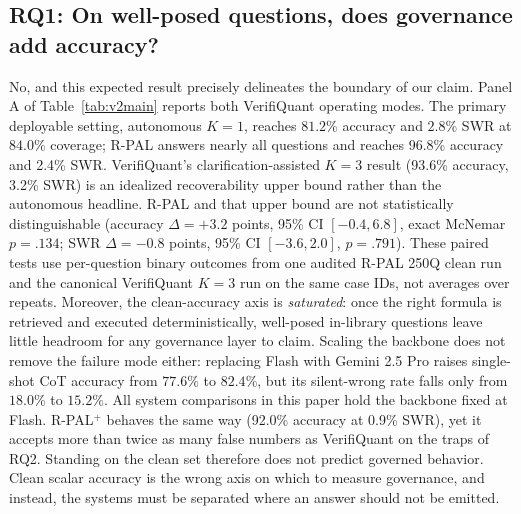 \documentclass[sigconf,anonymous]{acmart}
\newcommand{\vqAccAll}{93.6\%}
\newcommand{\vqSWRAll}{3.2\%}
\newcommand{\rpalAccAll}{96.8\%}
\newcommand{\rpalSWRAll}{2.4\%}
\newcommand{\govPromptAccAll}{92.0\%}
\newcommand{\govPromptSWRAll}{0.9\%}
\begin{document}
\subsection{RQ1: On well-posed questions, does governance add accuracy?}
No, and this expected result precisely delineates the boundary of our claim.
Panel A of Table~\ref{tab:v2main} reports both VerifiQuant operating modes. The primary deployable setting, autonomous $K{=}1$, reaches $81.2\%$ accuracy and $2.8\%$ SWR at $84.0\%$ coverage; R-PAL answers nearly all questions and reaches \rpalAccAll{} accuracy and \rpalSWRAll{} SWR. VerifiQuant's clarification-assisted $K{=}3$ result (\vqAccAll{} accuracy, \vqSWRAll{} SWR) is an idealized recoverability upper bound rather than the autonomous headline. R-PAL and that upper bound are not statistically distinguishable (accuracy $\Delta{=}{+}3.2$ points, 95\% CI $[-0.4, 6.8]$, exact McNemar $p{=}.134$; SWR $\Delta{=}{-}0.8$ points, 95\% CI $[-3.6, 2.0]$, $p{=}.791$). These paired tests use per-question binary outcomes from one audited R-PAL 250Q clean run and the canonical VerifiQuant $K{=}3$ run on the same case IDs, not averages over repeats. %
Moreover, the clean-accuracy axis is \emph{saturated}: once the right formula is retrieved and executed deterministically, well-posed in-library questions leave little headroom for any governance layer to claim.
Scaling the backbone does not remove the failure mode either: replacing Flash with Gemini 2.5 Pro raises single-shot CoT accuracy from $77.6\%$ to $82.4\%$, but its silent-wrong rate falls only from $18.0\%$ to $15.2\%$. All system comparisons in this paper hold the backbone fixed at Flash.
R-PAL$^{+}$ behaves the same way (\govPromptAccAll{} accuracy at \govPromptSWRAll{} SWR), yet it accepts more than twice as many false numbers as VerifiQuant on the traps of RQ2. Standing on the clean set therefore does not predict governed behavior.
Clean scalar accuracy is the wrong axis on which to measure governance, and instead, the systems must be separated where an answer should not be emitted.
\end{document}
